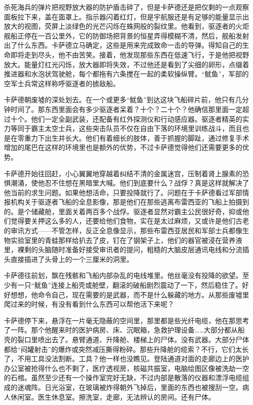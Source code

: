 \documentclass[AutoFakeBold=true]{book}
\begin{document}
杀死海兵的弹片把视野放大器的防护盾击碎了，但是卡萨德还是把仅剩的一点观察面板拉下来，盖在面罩上。指示器闪着红灯，但是宇航服还是有足够的能量显示出放大的视图，荧屏上淡绿色的光芒闪烁在蛛网般的裂纹里。他看到，驱逐者的火炬舰船正停在一百公里外，它的防御场把背景的恒星弄得模糊不清，然后，舰船发射出了什么东西。卡萨德立马确定，这些是用来完成致命一击的导弹。得知自己的生命即将走到尽头，他不由苦笑。接着，他发现那些东西在低速飞行，于是他把视野放大。能量灯红光闪烁，放大器即将失效，不过他还是看到了尖细的卵形，点缀着推进器和水泡状驾驶舱，每个都拖有六条搅在一起的柔软操纵臂。``鱿鱼''，军部的空军士兵常这样称呼驱逐者的掳敌船。

卡萨德朝废墟的深处划去。在一个或更多``鱿鱼''到达这块飞船碎片前，他只有几分钟时间了。那东西里面会有多少驱逐者呆着？十个？二十个？他确信那里面一定超过十个。他们一定全副武装，还配备有红外探测仪和行动感应器。驱逐者精英的实力等同于霸主太空士兵，这些突击队员不仅在自由下落的环境里训练战斗，而且也是在零重力下出生并长大。他们有着细长的肢体，善于抓握的脚趾，通过修复手术增加的尾巴在这样的环境里也是额外的优势，不过卡萨德觉得他们还需要更多的优势。

卡萨德开始往回赶，小心翼翼地穿越着纠结不清的金属迷宫，压制着肾上腺素的恐惧潮涌，使他忍不住想在黑暗里大喊。他们到底要什么？战俘？真是这样就解决了他当前的求生问题。如果他想活命，只要投降就行了。问题在于卡萨德看过军部情报机构关于驱逐者飞船的全息影像，那是他们在那些逃离布雷西亚的飞船上拍摄到的。是个储藏舱，里面关着两百多个战俘。驱逐者显然对霸主公民很好奇，抑或他们觉得要关押这么多的人，还要给他们食物，实在是太过麻烦，又或许是他们古老的审讯方式——不管怎样，反正全息像显示，那些布雷西亚居民和军部士兵都像生物实验室里的青蛙那样给扒去了皮，钉在了钢架子上，他们的器官被浸在营养液里，裸剩的头脑随时准备好接受审讯者的提问，粗糙的大脑皮层通讯电线和分流插头直接插进了头骨上的一个三厘米的洞里。

卡萨德往前划，飘在残骸和飞船内部杂乱的电线堆里。他丝毫没有投降的欲望。至少有一只``鱿鱼''连接上船壳或舱壁，翻滚的破船剧烈震动了一下，然后稳住了。好好想想，他命令自己，现在需要的是武器，而不是什么躲藏的地方。从那些废墟里爬过来的时候，有没有看到什么东西可以帮他活下来呢？

卡萨德停下来，悬浮在一片毫无隐蔽的空间里，那里都是些光纤电缆，他在那思考了一阵。那个他醒来时的医护病房、床、沉眠箱，急救护理设备……大部分都从船壳的裂口里喷出去了。悬臂通道、升降舱、楼梯上的尸体。没有武器。大部分尸体都给``闷罐射击''的爆炸或突然减压撕得粉碎。那些升降舱的缆索？不行，它们太长了，不用工具没法割断。工具？他一样也没瞧见。登陆通道对面的走廊边上的医护办公室被抢得什么也不剩了，医疗透视房，核磁共振室，电脑绘图区像被洗劫一空的石棺。虽然至少还有一个操作室完好无缺，不过内部是散落的仪器和漂浮电缆组成的迷魂阵。日光浴室，在玻璃被炸得朝外飞掉后，里面的东西也被搜刮一空。病人休闲室。医生休息室。擦洗室，走廊，无法辨认的房间。还有尸体。
\end{document}
